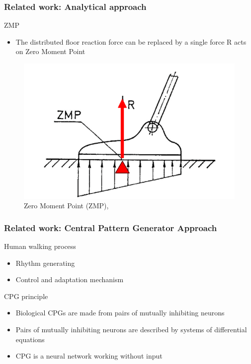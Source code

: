\documentclass{beamer}
\begin{document}
	\begin{frame}
		\frametitle{Related work: Analytical approach}
		\begin{block}{ZMP}
			\begin{itemize}
				\item
					The distributed floor reaction force can be replaced by a single force R
acts on Zero Moment Point
			\end{itemize}
		\end{block}
		
		\begin{figure}[h!]
			\begin{minipage}[H]{\linewidth}
				\centering
				\includegraphics[width=0.5\linewidth]{presentation_images/8}
				\caption{Zero Moment Point (ZMP), \cite{vukobratovic2004zero}}
			\end{minipage}
		\end{figure}
	\end{frame}
	

	\begin{frame}
		\frametitle{Related work: Central Pattern Generator Approach}
		\begin{block}{Human walking process}
			\begin{itemize}
				\item
					Rhythm generating
				\item
					Control and adaptation mechanism
					
			\end{itemize}
		\end{block}
		\begin{block}{CPG principle}
			\begin{itemize}
				\item
					Biological CPGs are made from pairs of mutually inhibiting neurons
				\item
					Pairs of mutually inhibiting neurons are described by systems of differential equations
				\item
					CPG is a neural network working without input
			\end{itemize}
		\end{block}
	\end{frame}
\end{document}
